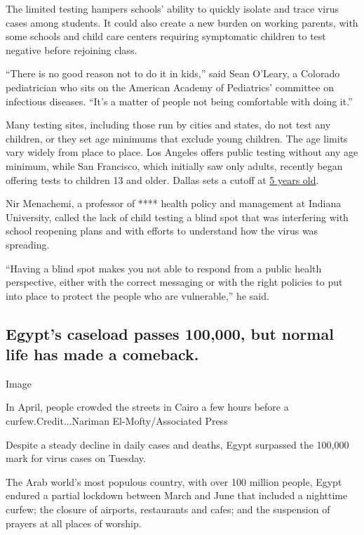 The limited testing hampers schools' ability to quickly isolate and
trace virus cases among students. It could also create a new burden on
working parents, with some schools and child care centers requiring
symptomatic children to test negative before rejoining class.

``There is no good reason not to do it in kids,'' said Sean O'Leary, a
Colorado pediatrician who sits on the American Academy of Pediatrics'
committee on infectious diseases. ``It's a matter of people not being
comfortable with doing it.''

Many testing sites, including those run by cities and states, do not
test any children, or they set age minimums that exclude young children.
The age limits vary widely from place to place. Los Angeles offers
public testing without any age minimum, while San Francisco, which
initially saw only adults, recently began offering tests to children 13
and older. Dallas sets a cutoff at
\href{https://www.dallascounty.org/covid-19/testing-locations.php}{5
years old}.

Nir Menachemi, a professor of **** health policy and management at
Indiana University, called the lack of child testing a blind spot that
was interfering with school reopening plans and with efforts to
understand how the virus was spreading.

``Having a blind spot makes you not able to respond from a public health
perspective, either with the correct messaging or with the right
policies to put into place to protect the people who are vulnerable,''
he said.

\hypertarget{egypts-caseload-passes-100000-but-normal-life-has-made-a-comeback}{%
\subsection{Egypt's caseload passes 100,000, but normal life has made a
comeback.}\label{egypts-caseload-passes-100000-but-normal-life-has-made-a-comeback}}

Image

In April, people crowded the streets in Cairo a few hours before a
curfew.Credit...Nariman El-Mofty/Associated Press

Despite a steady decline in daily cases and deaths, Egypt surpassed the
100,000 mark for virus cases on Tuesday.

The Arab world's most populous country, with over 100 million people,
Egypt endured a partial lockdown between March and June that included a
nighttime curfew; the closure of airports, restaurants and cafes; and
the suspension of prayers at all places of worship.


